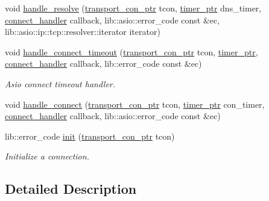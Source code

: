 \begin{DoxyCompactItemize}
void \hyperlink{classwebsocketpp_1_1transport_1_1asio_1_1endpoint_a97ded7b145e9d358747b7e0c0099594e}{handle\+\_\+resolve} (\hyperlink{classwebsocketpp_1_1transport_1_1asio_1_1endpoint_ac5fc306f32d15f92dd1b22366eaba62d}{transport\+\_\+con\+\_\+ptr} tcon, \hyperlink{classwebsocketpp_1_1transport_1_1asio_1_1endpoint_a1802f5762009dbed117ff793fa87468f}{timer\+\_\+ptr} dns\+\_\+timer, \hyperlink{namespacewebsocketpp_1_1transport_ac392fca34e946b48414278c0c3addfa5}{connect\+\_\+handler} callback, lib\+::asio\+::error\+\_\+code const \&ec, lib\+::asio\+::ip\+::tcp\+::resolver\+::iterator iterator)
\item 
void \hyperlink{classwebsocketpp_1_1transport_1_1asio_1_1endpoint_adf26b0ddc55fd6d223fd74be9e25d961}{handle\+\_\+connect\+\_\+timeout} (\hyperlink{classwebsocketpp_1_1transport_1_1asio_1_1endpoint_ac5fc306f32d15f92dd1b22366eaba62d}{transport\+\_\+con\+\_\+ptr} tcon, \hyperlink{classwebsocketpp_1_1transport_1_1asio_1_1endpoint_a1802f5762009dbed117ff793fa87468f}{timer\+\_\+ptr}, \hyperlink{namespacewebsocketpp_1_1transport_ac392fca34e946b48414278c0c3addfa5}{connect\+\_\+handler} callback, lib\+::error\+\_\+code const \&ec)
\begin{DoxyCompactList}\small\item\em Asio connect timeout handler. \end{DoxyCompactList}\item 
void \hyperlink{classwebsocketpp_1_1transport_1_1asio_1_1endpoint_a1d2dd1fcad6099397b53e5f6ede001a0}{handle\+\_\+connect} (\hyperlink{classwebsocketpp_1_1transport_1_1asio_1_1endpoint_ac5fc306f32d15f92dd1b22366eaba62d}{transport\+\_\+con\+\_\+ptr} tcon, \hyperlink{classwebsocketpp_1_1transport_1_1asio_1_1endpoint_a1802f5762009dbed117ff793fa87468f}{timer\+\_\+ptr} con\+\_\+timer, \hyperlink{namespacewebsocketpp_1_1transport_ac392fca34e946b48414278c0c3addfa5}{connect\+\_\+handler} callback, lib\+::asio\+::error\+\_\+code const \&ec)
\item 
lib\+::error\+\_\+code \hyperlink{classwebsocketpp_1_1transport_1_1asio_1_1endpoint_a756059ab3ecd99d7c2a845b40729c7c8}{init} (\hyperlink{classwebsocketpp_1_1transport_1_1asio_1_1endpoint_ac5fc306f32d15f92dd1b22366eaba62d}{transport\+\_\+con\+\_\+ptr} tcon)
\begin{DoxyCompactList}\small\item\em Initialize a connection. \end{DoxyCompactList}\end{DoxyCompactItemize}


\subsection{Detailed Description}
